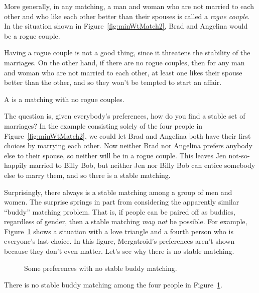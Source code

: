 More generally, in any matching, a man and woman who are not married
to each other and who like each other better than their spouses is
called a \emph{rogue couple}.  In the situation shown in
Figure~\ref{fig:minWtMatch2}, Brad and Angelina would be a rogue
couple.

Having a rogue couple is not a good thing, since it threatens the
stability of the marriages.  On the other hand, if there are no rogue
couples, then for any man and woman who are not married to each other,
at least one likes their spouse better than the other, and so they
won't be tempted to start an affair.

\begin{definition}
  A  is a matching with no rogue couples.
\end{definition}

The question is, given everybody's preferences, how do you find a
stable set of marriages?  In the example consisting solely of the four
people in Figure~\ref{fig:minWtMatch2}, we could let Brad and Angelina
both have their first choices by marrying each other.  Now neither
Brad nor Angelina prefers anybody else to their spouse, so neither
will be in a rogue couple.  This leaves Jen not-so-happily married to
Billy Bob, but neither Jen nor Billy Bob can entice somebody else to
marry them, and so there is a stable matching.

Surprisingly, there always is a stable matching among a group of men
and women.  The surprise springs in part from considering the
apparently similar ``buddy'' matching problem.  That is, if people can
be paired off as buddies, regardless of gender, then a stable matching
\emph{may not} be possible.  For example, Figure~\ref{fig:buddy} shows
a situation with a love triangle and a fourth person who is everyone's
last choice.  In this figure, Mergatroid's preferences aren't shown
because they don't even matter.  Let's see why there is no stable
matching.

\begin{figure}[htbp]


\caption{Some preferences with no stable buddy matching.}
\label{fig:buddy}
\end{figure}

\begin{lemma}\label{lem:nostablematch}
There is no stable buddy matching among the four people in
Figure~\ref{fig:buddy}.
\end{lemma}

